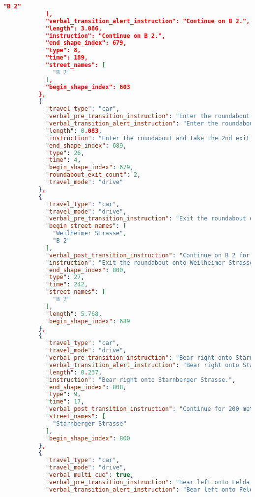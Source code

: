 \begin{lstlisting}[language=json,breaklines=true]
              "B 2"
            ],
            "verbal_transition_alert_instruction": "Continue on B 2.",
            "length": 3.086,
            "instruction": "Continue on B 2.",
            "end_shape_index": 679,
            "type": 8,
            "time": 189,
            "street_names": [
              "B 2"
            ],
            "begin_shape_index": 603
          },
          {
            "travel_type": "car",
            "verbal_pre_transition_instruction": "Enter the roundabout and take the 2nd exit.",
            "verbal_transition_alert_instruction": "Enter the roundabout and take the 2nd exit.",
            "length": 0.083,
            "instruction": "Enter the roundabout and take the 2nd exit.",
            "end_shape_index": 689,
            "type": 26,
            "time": 4,
            "begin_shape_index": 679,
            "roundabout_exit_count": 2,
            "travel_mode": "drive"
          },
          {
            "travel_type": "car",
            "travel_mode": "drive",
            "verbal_pre_transition_instruction": "Exit the roundabout onto Weilheimer Strasse, B 2.",
            "begin_street_names": [
              "Weilheimer Strasse",
              "B 2"
            ],
            "verbal_post_transition_instruction": "Continue on B 2 for 5.8 kilometers.",
            "instruction": "Exit the roundabout onto Weilheimer Strasse/B 2. Continue on B 2.",
            "end_shape_index": 800,
            "type": 27,
            "time": 242,
            "street_names": [
              "B 2"
            ],
            "length": 5.768,
            "begin_shape_index": 689
          },
          {
            "travel_type": "car",
            "travel_mode": "drive",
            "verbal_pre_transition_instruction": "Bear right onto Starnberger Strasse.",
            "verbal_transition_alert_instruction": "Bear right onto Starnberger Strasse.",
            "length": 0.237,
            "instruction": "Bear right onto Starnberger Strasse.",
            "end_shape_index": 808,
            "type": 9,
            "time": 17,
            "verbal_post_transition_instruction": "Continue for 200 meters.",
            "street_names": [
              "Starnberger Strasse"
            ],
            "begin_shape_index": 800
          },
          {
            "travel_type": "car",
            "travel_mode": "drive",
            "verbal_multi_cue": true,
            "verbal_pre_transition_instruction": "Bear left onto Feldafinger Strasse. Then Bear left to stay on Feldafinger Strasse.",
            "verbal_transition_alert_instruction": "Bear left onto Feldafinger Strasse.",

\end{lstlisting}
